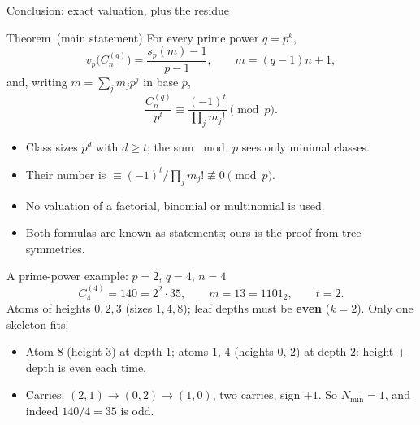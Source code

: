 \documentclass[aspectratio=169,11pt]{beamer}
\newcommand{\claimstatus}{}
\newcommand{\ourresult}{Theorem}
\newcommand{\status}{\par\vfill{\tiny\color{gray}\claimstatus\par}}
\newcommand{\vp}{v_p}
\newcommand{\sd}{s_p}
\newcommand{\Cq}{C_n^{(q)}}
\begin{document}
\begin{frame}{Conclusion: exact valuation, plus the residue}
  \begin{block}{\ourresult\ (main statement)}
    For every prime power $q=p^k$,
    \[
      \vp\!\bigl(\Cq\bigr)=\frac{\sd(m)-1}{p-1},
      \qquad m=(q-1)n+1,
    \]
    and, writing $m=\sum_j m_jp^j$ in base $p$,
    \[
      \frac{\Cq}{p^t}\equiv\frac{(-1)^t}{\prod_j m_j!}\pmod p .
    \]
  \end{block}
  \begin{itemize}\small\setlength{\itemsep}{1pt}
    \item Class sizes $p^d$ with $d\ge t$; the sum $\bmod\,p$ sees only minimal classes.
    \item Their number is $\equiv(-1)^t/\prod_j m_j!\not\equiv 0\pmod p$.
    \item No valuation of a factorial, binomial or multinomial is used.
    \item Both formulas are known as statements; ours is the proof from tree symmetries.
  \end{itemize}
  \status
\end{frame}

\begin{frame}{A prime-power example: $p=2$, $q=4$, $n=4$}
  \[
    C_4^{(4)}=140=2^2\cdot 35,\qquad m=13=1101_2,\qquad t=2 .
  \]
  Atoms of heights $0,2,3$ (sizes $1,4,8$); leaf depths must be \textbf{even}
  ($k=2$). Only one skeleton fits:
  \begin{center}
  \end{center}
  \begin{itemize}
    \item Atom $8$ (height $3$) at depth $1$; atoms $1$, $4$ (heights $0$, $2$) at depth $2$:
          height $+$ depth is even each time.
    \item Carries: $(2,1)\to(0,2)\to(1,0)$, two carries, sign $+1$.
          So $N_{\min}=1$, and indeed $140/4=35$ is odd.
  \end{itemize}
  \status
\end{frame}
\end{document}
